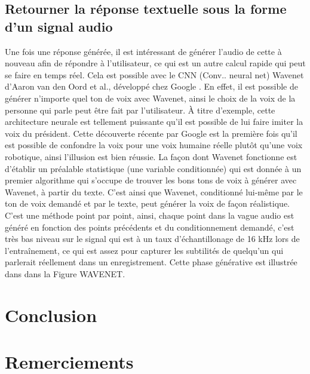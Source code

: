 \documentclass[11pt]{article}
\begin{document}
\subsection{Retourner la réponse textuelle sous la forme d'un signal audio}
Une fois une réponse générée, il est intéressant de générer l’audio de cette à nouveau afin de répondre à l’utilisateur, ce qui est un autre calcul rapide qui peut se faire en temps réel. Cela est possible avec le CNN (Conv.. neural net) Wavenet d’Aaron van den Oord et al., développé chez Google \cite{wavenet}. En effet, il est possible de générer n’importe quel ton de voix avec Wavenet, ainsi le choix de la voix de la personne qui parle peut être fait par l’utilisateur. À titre d’exemple, cette architecture neurale est tellement puissante qu’il est possible de lui faire imiter la voix du président. Cette découverte récente par Google est la première fois qu’il est possible de confondre la voix pour une voix humaine réelle plutôt qu’une voix robotique, ainsi l’illusion est bien réussie. La façon dont Wavenet fonctionne est d’établir un préalable statistique (une variable conditionnée) qui est donnée à un premier algorithme qui s’occupe de trouver les bons tons de voix à générer avec Wavenet, à partir du texte. C’est ainsi que Wavenet, conditionné lui-même par le ton de voix demandé et par le texte, peut générer la voix de façon réalistique. C’est une méthode point par point, ainsi, chaque point dans la vague audio est généré en fonction des points précédents et du conditionnement demandé, c’est très bas niveau sur le signal qui est à un taux d’échantillonage de 16 kHz lors de l’entraînement, ce qui est assez pour capturer les subtilités de quelqu’un qui parlerait réellement dans un enregistrement. Cette phase générative est illustrée dans dans la Figure WAVENET.


\section*{Conclusion}

\section*{Remerciements}





\end{document}
